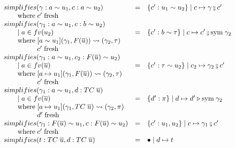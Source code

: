 \begin{figure}
\[
\begin{array}{l c l}
simplifies(\gamma : a \sim u_1, c : a \sim u_2) &=& \{c' : u_1 \sim u_2\} \mid c
\mapsto \gamma \fctrans c'
\\ \where c' \; \text{fresh}
\\
simplifies(\gamma_1 : a \sim u_1, c : b \sim u_2)
\\ \guard a \in fv(u_2) &=& \{c' : b \sim \tau\} \mid c \mapsto c' \fctrans
\text{sym} \; \gamma_2
\\ \where [a \sim u_1](\gamma_1, F(\overline{u})) \rightsquigarrow (\gamma_2,
\tau)
\\ \whereindent c' \; \text{fresh}
\\
simplifies(\gamma_1 : a \sim u_1, c_2 : F(\overline{u}) \sim u_2)
\\ \guard a \in fv(\overline{u}) &=& \{c': \tau \sim u_2\} \mid c_2 \mapsto
\gamma_2 \fctrans c'
\\ \where [a \mapsto u_1](\gamma_1, F(\overline{u})) \rightsquigarrow (\gamma_2,
\tau)
\\ \whereindent c' \; \text{fresh}
\\
simplifies(\gamma_1 : a \sim u_1, d : TC \; \overline{u})
\\ \guard a \in fv(\overline{u}) &=& \{d' : \pi\} \mid d \mapsto
d' \triangleright \text{sym} \; \gamma_2
\\ \where [a \mapsto u_1](\gamma_1, TC \; \overline{u}) \rightsquigarrow
(\gamma_2, \pi)
\\ \whereindent d' \; \text{fresh}
\\
simplifies(\gamma_1 : F(\overline{u}) \sim u_1, c : F(\overline{u}) \sim u_2)
&=& \{c' : u_1, u_2\} \mid c \mapsto \gamma_1 \fctrans c'
\\ \where c' \; \text{fresh}
\\
simplifies(t : TC \; \overline{u}, d : TC \; \overline{u}) &=& \bullet \mid d
\mapsto t
\end{array}
\]
\end{figure}

